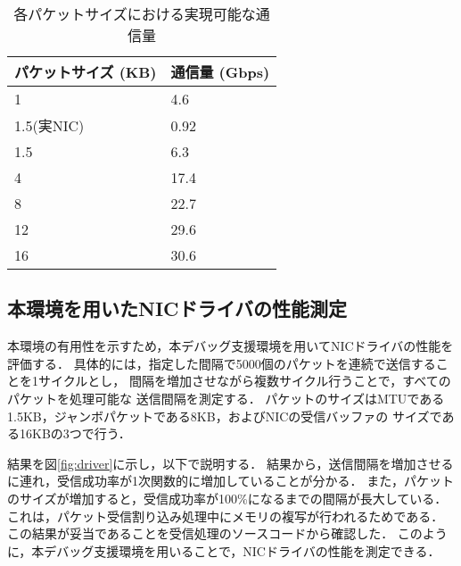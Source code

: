 \documentclass[submit,techreq,noauthor,dvipdfmx]{ipsj}
\begin{document}
\begin{table}[h]
    \caption{各パケットサイズにおける実現可能な通信量}
    \label{throughput-nic}
    \begin{center}
        \begin{tabular}{l|l}   \hline \hline 
            パケットサイズ (KB)      & 通信量 (Gbps)  \\ \hline
            1                        & 4.6            \\
            1.5(実NIC)               & 0.92           \\
            1.5                      & 6.3            \\
            4                        & 17.4           \\
            8                        & 22.7           \\
            12                       & 29.6           \\
            16                       & 30.6           \\ \hline
        \end{tabular}
    \end{center}
\end{table}

\subsection{本環境を用いたNICドライバの性能測定}\label{sec:interval}

本環境の有用性を示すため，本デバッグ支援環境を用いてNICドライバの性能を
評価する．
具体的には，指定した間隔で5000個のパケットを連続で送信することを1サイクルとし，
間隔を増加させながら複数サイクル行うことで，すべてのパケットを処理可能な
送信間隔を測定する．
パケットのサイズはMTUである1.5KB，ジャンボパケットである8KB，およびNICの受信バッファの
サイズである16KBの3つで行う．

結果を図\ref{fig:driver}に示し，以下で説明する．
結果から，送信間隔を増加させるに連れ，受信成功率が1次関数的に増加していることが分かる．
また，パケットのサイズが増加すると，受信成功率が100\%になるまでの間隔が長大している．
これは，パケット受信割り込み処理中にメモリの複写が行われるためである．
この結果が妥当であることを受信処理のソースコードから確認した．
このように，本デバッグ支援環境を用いることで，NICドライバの性能を測定できる．

\end{document}
